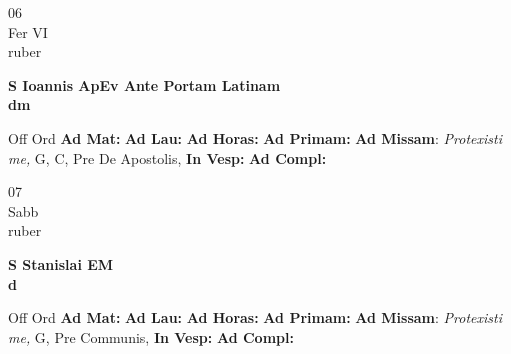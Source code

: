 \documentclass[10pt, openany]{book}
\begin{document}
    \begin{center}
        \begin{minipage}{3.5in}
            \vspace{2em}
            \begin{minipage}{0.5in}
                {\Huge 06} \\
                {\normalsize Fer VI} \\
                {\normalsize ruber}
            \end{minipage}
            \begin{minipage}{3.0in}
                \textbf{ \large S Ioannis ApEv Ante Portam Latinam \\
                \textnormal{\normalsize dm}} \\ 
            \end{minipage}
            \begin{justify}Off Ord
                \textbf{Ad Mat: }
                \textbf{Ad Lau: }
                \textbf{Ad Horas: }
                \textbf{Ad Primam: }\textbf{Ad Missam}: \textit{Protexisti me,} G, C, Pre De Apostolis,  
                \textbf{In Vesp: }
                \textbf{Ad Compl: }
            \end{justify}
        \end{minipage}
    \end{center}

    \begin{center}
        \begin{minipage}{3.5in}
            \vspace{2em}
            \begin{minipage}{0.5in}
                {\Huge 07} \\
                {\normalsize Sabb} \\
                {\normalsize ruber}
            \end{minipage}
            \begin{minipage}{3.0in}
                \textbf{ \large S Stanislai EM \\
                \textnormal{\normalsize d}} \\ 
            \end{minipage}
            \begin{justify}Off Ord
                \textbf{Ad Mat: }
                \textbf{Ad Lau: }
                \textbf{Ad Horas: }
                \textbf{Ad Primam: }\textbf{Ad Missam}: \textit{Protexisti me,} G, Pre Communis,  
                \textbf{In Vesp: }
                \textbf{Ad Compl: }
            \end{justify}
        \end{minipage}
    \end{center}
\end{document}
